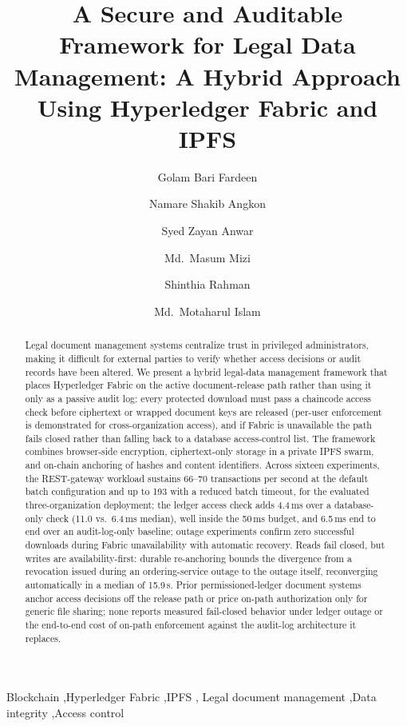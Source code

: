 \documentclass[preprint,12pt]{elsarticle}
\begin{document}
\begin{frontmatter}

\title{A Secure and Auditable Framework for Legal Data Management:
A Hybrid Approach Using Hyperledger Fabric and IPFS}

\author[uiu]{Golam Bari Fardeen}
\author[uiu]{Namare Shakib Angkon}
\author[uiu]{Syed Zayan Anwar}
\author[uiu]{Md.\ Masum Mizi}
\author[uiu]{Shinthia Rahman}
\author[uiu]{Md.\ Motaharul Islam}


\begin{abstract}
Legal document management systems centralize trust in privileged administrators, making it difficult for external parties to verify whether access decisions or audit records have been altered. We present a hybrid legal-data management framework that places Hyperledger Fabric on the active document-release path rather than using it only as a passive audit log: every protected download must pass a chaincode access check before ciphertext or wrapped document keys are released (per-user enforcement is demonstrated for cross-organization access), and if Fabric is unavailable the path fails closed rather than falling back to a database access-control list. The framework combines browser-side encryption, ciphertext-only storage in a private IPFS swarm, and on-chain anchoring of hashes and content identifiers. Across sixteen experiments, the REST-gateway workload sustains 66--70 transactions per second at the default batch configuration and up to 193 with a reduced batch timeout, for the evaluated three-organization deployment; the ledger access check adds 4.4\,ms over a database-only check (11.0 vs.\ 6.4\,ms median), well inside the 50\,ms budget, and 6.5\,ms end to end over an audit-log-only baseline; outage experiments confirm zero successful downloads during Fabric unavailability with automatic recovery. Reads fail closed, but writes are availability-first: durable re-anchoring bounds the divergence from a revocation issued during an ordering-service outage to the outage itself, reconverging automatically in a median of 15.9\,s. Prior permissioned-ledger document systems anchor access decisions off the release path or price on-path authorization only for generic file sharing; none reports measured fail-closed behavior under ledger outage or the end-to-end cost of on-path enforcement against the audit-log architecture it replaces.
\end{abstract}

\begin{keyword}
Blockchain \sep Hyperledger Fabric \sep IPFS \sep
Legal document management \sep Data integrity \sep Access control
\end{keyword}

\end{frontmatter}
\end{document}
